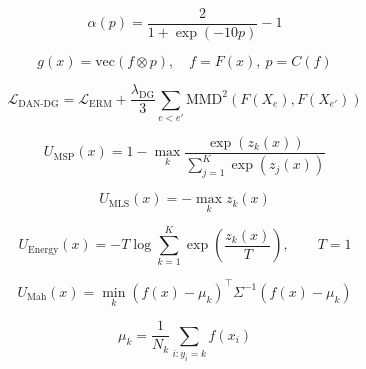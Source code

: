 \documentclass{article}
\begin{document}
\begin{equation}
\alpha(p) = \frac{2}{1 + \exp(-10p)} - 1
\label{eq:grl}
\end{equation}

\begin{equation}
g(x) = \text{vec}(f \otimes p), \quad f = F(x),\ p = C(f)
\label{eq:cdan}
\end{equation}

\begin{equation}
\mathcal{L}_{\text{DAN-DG}} = \mathcal{L}_{\text{ERM}} + \frac{\lambda_{\text{DG}}}{3} \sum_{e < e'} \text{MMD}^2\left(F(X_e), F(X_{e'})\right)
\label{eq:dandg}
\end{equation}

\begin{equation}
U_{\mathrm{MSP}}(x)
=
1 - \max_{k}
\frac{\exp(z_k(x))}
{\sum_{j=1}^{K}\exp(z_j(x))}
\label{eq:msp}
\end{equation}

\begin{equation}
U_{\mathrm{MLS}}(x)
=
-\max_{k} z_k(x)
\label{eq:mls}
\end{equation}

\begin{equation}
U_{\mathrm{Energy}}(x)
=
-T \log
\sum_{k=1}^{K}
\exp\left(\frac{z_k(x)}{T}\right),
\qquad T=1
\label{eq:energy}
\end{equation}

\begin{equation}
U_{\mathrm{Mah}}(x)
=
\min_{k}
\left(f(x)-\mu_k\right)^\top
\Sigma^{-1}
\left(f(x)-\mu_k\right)
\label{eq:mahalanobis}
\end{equation}

\begin{equation}
\mu_k
=
\frac{1}{N_k}
\sum_{i:y_i=k} f(x_i)
\label{eq:mahalanobis_mean}
\end{equation}
\end{document}
